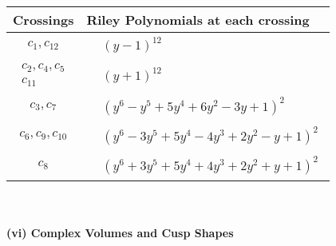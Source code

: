 \documentclass[1p]{elsarticle_modified}
\theoremstyle{definition}
\begin{document}
\begin{tabular}{m{50pt}|m{274pt}}
Crossings & \hspace{64pt}Riley Polynomials at each crossing \\
\hline $$\begin{aligned}c_{1},c_{12}\end{aligned}$$&$\begin{aligned}
&(y-1)^{12}
\end{aligned}$\\
\hline $$\begin{aligned}c_{2},c_{4},c_{5}\\c_{11}\end{aligned}$$&$\begin{aligned}
&(y+1)^{12}
\end{aligned}$\\
\hline $$\begin{aligned}c_{3},c_{7}\end{aligned}$$&$\begin{aligned}
&(y^6- y^5+5 y^4+6 y^2-3 y+1)^2
\end{aligned}$\\
\hline $$\begin{aligned}c_{6},c_{9},c_{10}\end{aligned}$$&$\begin{aligned}
&(y^6-3 y^5+5 y^4-4 y^3+2 y^2- y+1)^2
\end{aligned}$\\
\hline $$\begin{aligned}c_{8}\end{aligned}$$&$\begin{aligned}
&(y^6+3 y^5+5 y^4+4 y^3+2 y^2+y+1)^2
\end{aligned}$\\
\hline
\end{tabular}\\~\\
\newpage\flushleft \textbf{(vi) Complex Volumes and Cusp Shapes}
\end{document}

